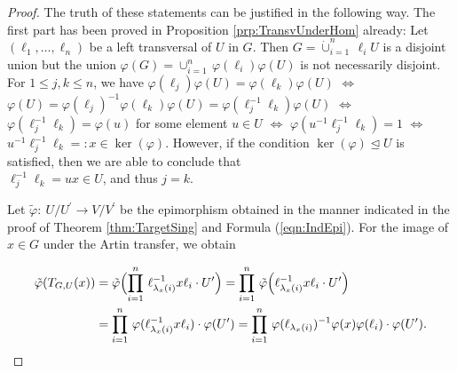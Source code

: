\documentclass{amsart}
\theoremstyle{definition}
\numberwithin{equation}{section}
\begin{document}
\begin{proof}
The truth of these statements can be justified in the following way.
The first part has been proved in Proposition
\ref{prp:TransvUnderHom}
already:
Let \((\ell_1,\ldots,\ell_n)\) be a left transversal of \(U\) in \(G\).
Then \(G=\dot{\cup}_{i=1}^n\,\ell_iU\) is a disjoint union
but the union \(\varphi(G)=\cup_{i=1}^n\,\varphi(\ell_i)\varphi(U)\) is not necessarily disjoint.
For \(1\le j,k\le n\),
we have \(\varphi(\ell_j)\varphi(U)=\varphi(\ell_k)\varphi(U)\)
\(\Leftrightarrow\) \(\varphi(U)=\varphi(\ell_j)^{-1}\varphi(\ell_k)\varphi(U)=\varphi(\ell_j^{-1}\ell_k)\varphi(U)\)
\(\Leftrightarrow\) \(\varphi(\ell_j^{-1}\ell_k)=\varphi(u)\) for some element \(u\in U\)
\(\Leftrightarrow\) \(\varphi(u^{-1}\ell_j^{-1}\ell_k)=1\)
\(\Leftrightarrow\) \(u^{-1}\ell_j^{-1}\ell_k=:x\in\ker(\varphi)\).
However, if the condition \(\ker(\varphi)\unlhd U\) is satisfied, then we are able to conclude that\\
\(\ell_j^{-1}\ell_k=ux\in U\), and thus \(j=k\).

Let \(\tilde{\varphi}:\ U/U^\prime\to V/V^\prime\)
be the epimorphism obtained in the manner indicated in the proof of Theorem
\ref{thm:TargetSing}
and Formula
(\ref{eqn:IndEpi}).
For the image of \(x\in G\) under the Artin transfer, we obtain

\begin{equation*}
\begin{aligned}
\tilde{\varphi}(T_{G,U}(x))
&= \tilde{\varphi}\Bigl(\prod_{i=1}^n\,\ell_{\lambda_x(i)}^{-1}x\ell_i\cdot U^\prime\Bigr)
=\prod_{i=1}^n\,\tilde{\varphi}\Bigl(\ell_{\lambda_x(i)}^{-1}x\ell_i\cdot U^\prime\Bigr) \\
&=\prod_{i=1}^n\,\varphi(\ell_{\lambda_x(i)}^{-1}x\ell_i)\cdot\varphi(U^\prime)
=\prod_{i=1}^n\,\varphi(\ell_{\lambda_x(i)})^{-1}\varphi(x)\varphi(\ell_i)\cdot\varphi(U^\prime).
\end{aligned}
\end{equation*}


\end{proof}
\end{document}
